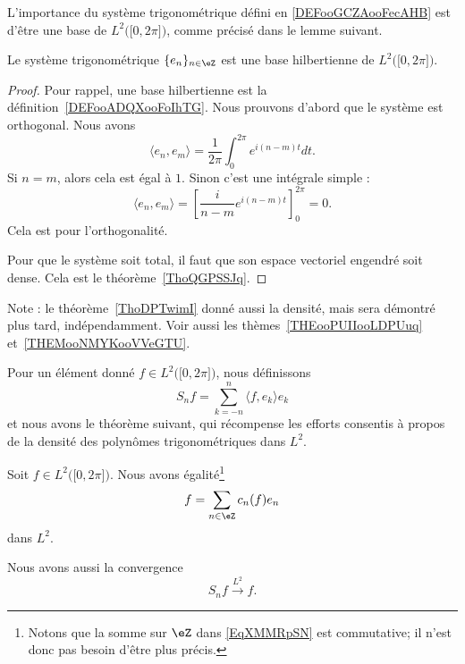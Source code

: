 L'importance du système trigonométrique défini en \ref{DEFooGCZAooFecAHB} est d'être une base de \( L^2\big( \mathopen[ 0 , 2\pi \mathclose] \big)\), comme précisé dans le lemme suivant.
\begin{lemma}       \label{LEMooBJDQooLVPczR}
    Le système trigonométrique \( \{ e_n \}_{n\in \eZ}\) est une base hilbertienne de \( L^2\big( \mathopen[ 0 , 2\pi \mathclose] \big)\).
\end{lemma}

\begin{proof}
    Pour rappel, une base hilbertienne est la définition~\ref{DEFooADQXooFoIhTG}. Nous prouvons d'abord que le système est orthogonal. Nous avons
    \begin{equation}
        \langle e_n, e_m\rangle =\frac{1}{ 2\pi }\int_0^{2\pi} e^{i(n-m)t}dt.
    \end{equation}
    Si \( n=m\), alors cela est égal à \( 1\). Sinon c'est une intégrale simple :
    \begin{equation}
        \langle e_n, e_m\rangle =\left[ \frac{ i }{ n-m } e^{i(n-m)t} \right]_0^{2\pi}=0.
    \end{equation}
    Cela est pour l'orthogonalité.

    Pour que le système soit total, il faut que son espace vectoriel engendré soit dense. Cela est le théorème~\ref{ThoQGPSSJq}.
\end{proof}

Note : le théorème~\ref{ThoDPTwimI} donné aussi la densité, mais sera démontré plus tard, indépendamment. Voir aussi les thèmes~\ref{THEooPUIIooLDPUuq} et~\ref{THEMooNMYKooVVeGTU}.

Pour un élément donné \( f\in L^2\big( \mathopen[ 0 , 2\pi \mathclose] \big)\), nous définissons
\begin{equation}
    S_nf=\sum_{k=-n}^n\langle f, e_k\rangle e_k
\end{equation}
et nous avons le théorème suivant, qui récompense les efforts consentis à propos de la densité des polynômes trigonométriques dans \( L^2\).

\begin{theorem} \label{ThoYDKZLyv}
    Soit \( f\in L^2\big( \mathopen[ 0 , 2\pi \mathclose] \big)\). Nous avons égalité\footnote{Notons que la somme sur \( \eZ\) dans \eqref{EqXMMRpSN} est commutative; il n'est donc pas besoin d'être plus précis.}
    \begin{equation}    \label{EqXMMRpSN}
        f=\sum_{n\in \eZ}c_n(f)e_n
    \end{equation}
    dans \( L^2\).

    Nous avons aussi la convergence
\begin{equation}    \label{EqRBWKsYP}
    S_nf\stackrel{L^2}{\to} f.
\end{equation}
\end{theorem}

